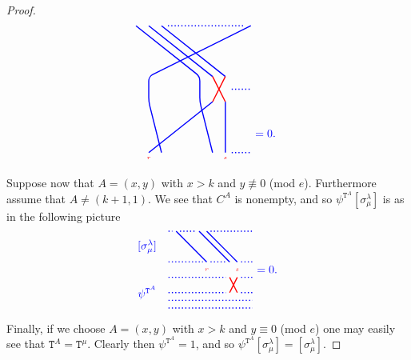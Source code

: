 \documentclass[twoside,11pt,reqno,letter]{amsart}
\numberwithin{equation}{section}
\theoremstyle{definition}  %
\newcommand{\0}{{\bar 0}}
\newcommand{\1}{{\bar 1}}
\newcommand{\la}{\lambda}
\newcommand{\si}{\sigma}
\def\T{{\mathtt T}}
\newenvironment{braid}{%
  \begin{tikzpicture}[baseline=6mm,blue,line width=1pt, scale=0.4,
                      draw/.append style={rounded corners},
                      every node/.append style={font=\tiny}]%
  }{\end{tikzpicture}
}
\begin{document}
{\begin{proof}
\[\begin{braid}
    \draw(4,10)--(9,6)--(9,4)--(10,0);
    \draw(5,10)--(10,6);
      \draw[color=red](10,6)--(11,4);
      \draw(11,4)--(11,0)node[below, color=red]{$s$};
    \draw(6,10)--(11,6);
      \draw[color=red](11,6)--(10,4);
      \draw(10,4)--(5,0)node[below, color=red]{$r$};

    \draw[dotted](6.5,10)--(12.5,10);

    \draw(13,10)--(5,6)--(5,4)--(6,0);

    \draw[dotted](11.5,5)--(13,5);
    \draw[dotted](11.5,0)--(13,0);
  \end{braid}
  \begin{braid}\tikzset{scale=0.6,baseline=12mm}
    \draw(0,5)node[font=\normalsize]{$=0$.};
  \end{braid}
\]






  Suppose now that $A = (x,y)$ with $x > k$ and $y \not \equiv 0$ (mod $e$). Furthermore assume that $A \neq (k+1, 1)$. We see that $C^A$ is nonempty, and so $\psi^{\T^A} [\si^\la_\mu]$ is as in the following picture
\[
  \begin{braid}\tikzset{scale=0.6,baseline=12mm}
    \draw[dotted](0,10)--(0.5,10);
    \draw[dotted](0,6)--(4.5,6);
    \draw[dotted](0,4)--(7.5,4);
    \draw[dotted](0,2)--(7.5,2);

    \draw(1,10)--(5,6);
      \draw(5,5)node[color=red]{$r$};

    \draw[dotted](1.5,10)--(3.5,10);
    \draw[dotted](5.5,6)--(7.5,6);

    \draw(4,10)--(8,6);
      \draw[color=red](8,4)--(9,2);
    \draw(5,10)--(9,6);
      \draw(9,5)node[color=red]{$s$};
      \draw[color=red](9,4)--(8,2);

    \draw[dotted](5.5,10)--(11,10);
    \draw[dotted](9.5,6)--(11,6);
    \draw[dotted](9.5,4)--(11,4);
    \draw[dotted](9.5,2)--(11,2);

    \draw[dotted](0,1)--(11,1);
    \draw[dotted](0,0)--(11,0);

    \draw(-1,8)node[left,font=\normalsize]{$[\si^\la_\mu]$};
    \draw(-1,2)node[left,font=\normalsize]{$\psi^{\T^A}$};
  \end{braid}
  \begin{braid}\tikzset{scale=0.6,baseline=12mm}
    \draw(0,5)node[font=\normalsize]{$=0$.};
  \end{braid}
\]




  Finally, if we choose $A = (x,y)$ with $x > k$ and $y \equiv 0$ (mod $e$) one may easily see that $\T^A = \T^\mu$. Clearly then $\psi^{\T^A}=1$, and so $\psi^{\T^A} [\si^\la_\mu] = [\si^\la_\mu]$.
\end{proof}









}
\end{document}
